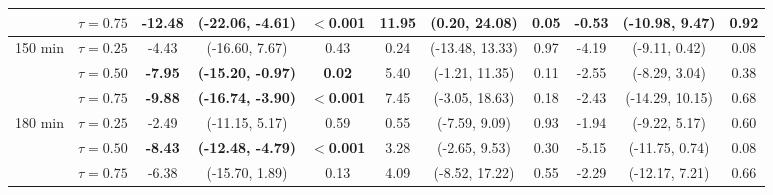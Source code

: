 \begin{table}[ht]
{\begin{tabular}{llccccccccc}
 & $\tau=0.75$ & \textbf{-12.48} & \textbf{(-22.06, -4.61)} & \textbf{$<$0.001} & \textbf{11.95} & \textbf{(0.20, 24.08)} & \textbf{0.05} & -0.53 & (-10.98, 9.47) & 0.92 \\
\midrule
\multirow{3}{*}{150 min} & $\tau=0.25$ & -4.43 & (-16.60, 7.67) & 0.43 & 0.24 & (-13.48, 13.33) & 0.97 & -4.19 & (-9.11, 0.42) & 0.08 \\
 & $\tau=0.50$ & \textbf{-7.95} & \textbf{(-15.20, -0.97)} & \textbf{0.02} & 5.40 & (-1.21, 11.35) & 0.11 & -2.55 & (-8.29, 3.04) & 0.38 \\
 & $\tau=0.75$ & \textbf{-9.88} & \textbf{(-16.74, -3.90)} & \textbf{$<$0.001} & 7.45 & (-3.05, 18.63) & 0.18 & -2.43 & (-14.29, 10.15) & 0.68 \\
\midrule
\multirow{3}{*}{180 min} & $\tau=0.25$ & -2.49 & (-11.15, 5.17) & 0.59 & 0.55 & (-7.59, 9.09) & 0.93 & -1.94 & (-9.22, 5.17) & 0.60 \\
 & $\tau=0.50$ & \textbf{-8.43} & \textbf{(-12.48, -4.79)} & \textbf{$<$0.001} & 3.28 & (-2.65, 9.53) & 0.30 & -5.15 & (-11.75, 0.74) & 0.08 \\
 & $\tau=0.75$ & -6.38 & (-15.70, 1.89) & 0.13 & 4.09 & (-8.52, 17.22) & 0.55 & -2.29 & (-12.17, 7.21) & 0.66 \\
\bottomrule
\end{tabular}%
}
\end{table}
